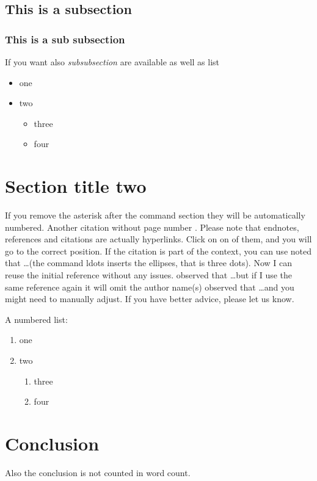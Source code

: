 \documentclass[mla8]{mla}
\begin{document}
\begin{paper}
\subsection{ This is a subsection}
\subsubsection{This is a sub subsection}
If you want also \textit{subsubsection} are available as well as list
\begin{itemize}
    \item one
    \item two
    \begin{itemize}
        \item three
        \item four
    \end{itemize}
\end{itemize}



\section*{Section title two}
If you remove the asterisk after the command section they will be automatically numbered. Another citation without page number \parencite{mishkin_eakins_2018}. Please note that endnotes, references and citations are actually hyperlinks. Click on on of them, and you will go to the correct position.
If the citation is part of the context, you can use \cite[p.~32]{hull_options_2015} noted that \ldots (the command ldots inserts the ellipses, that is three dots). Now I can reuse the initial reference without any issues. \cite{mishkin_eakins_2018} observed that \ldots but if I use the same reference again it will omit the author name(s) \cite[p.~121]{mishkin_eakins_2018} observed that \ldots and you might need to manually adjust. If you have better advice, please let us know. 

A numbered list:
\begin{enumerate}
    \item one
    \item two
    \begin{enumerate}
        \item three
        \item four
    \end{enumerate}
\end{enumerate}

\section*{Conclusion}
Also the conclusion is not counted in word count. 

\end{paper}

\begin{notes}
\printendnotes
\end{notes}

\begin{workscited}
\printbibliography[heading=none]
\end{workscited}
\end{document}
